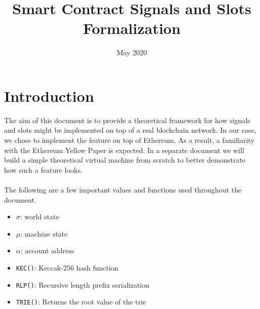 \documentclass{article}
\title{Smart Contract Signals and Slots Formalization}
\date{May 2020}
\begin{document}
\maketitle


\section{Introduction}
The aim of this document is to provide a theoretical framework for how signals and slots might be implemented on top of a real blockchain network. In our case, we chose to implement the feature on top of Ethereum. As a result, a familiarity with the Ethereum Yellow Paper is expected. In a separate document we will build a simple theoretical virtual machine from scratch to better demonstrate how such a feature looks.
\\\\
The following are a few important values and functions used throughout the document.
\begin{itemize}
    \item $\sigma$: world state
    \item $\mu$: machine state
    \item $\alpha$: account address
    \item \texttt{KEC()}: Keccak-256 hash function
    \item \texttt{RLP()}: Recursive length prefix serialization
    \item \texttt{TRIE()}: Returns the root value of the trie 
\end{itemize}
\end{document}
